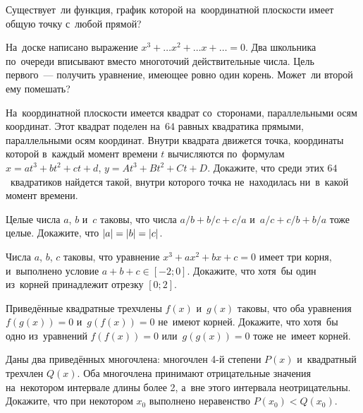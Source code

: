 \begin{problems}

\item
Существует~ли функция, график которой на~координатной плоскости имеет общую
точку с~любой прямой?

\item
На~доске написано выражение $x^{3} + \ldots x^{2} + \ldots x + \ldots = 0$.
Два школьника по~очереди вписывают вместо многоточий действительные числа.
Цель первого~--- получить уравнение, имеющее ровно один корень.
Может~ли второй ему помешать?

\item
На~координатной плоскости имеется квадрат со~сторонами, параллельными осям
координат.
Этот квадрат поделен на~$64$ равных квадратика прямыми, параллельными осям
координат.
Внутри квадрата движется точка, координаты которой в~каждый момент времени $t$
вычисляются по~формулам
$x = a t^3 + b t^2 + c t + d$, $y = A t^3 + B t^2 + C t + D$.
Докажите, что среди этих $64$~квадратиков найдется такой, внутри которого точка
не~находилась ни~в~какой момент времени.

\item
Целые числа $a$, $b$ и~$c$ таковы, что числа
$a / b + b / c + c / a$ и~$a / c + c / b + b / a$ тоже целые.
Докажите, что $\lvert a \rvert = \lvert b \rvert = \lvert c \rvert$.

\item
Числа $a$, $b$, $c$ таковы, что уравнение $x^3 + a x^2 + b x  + c = 0$ имеет
три корня, и~выполнено условие $a + b + c \in [-2; 0]$.
Докажите, что хотя~бы один из~корней принадлежит отрезку $[0; 2]$.

\item
Приведённые квадратные трехчлены $f(x)$ и~$g(x)$ таковы, что оба уравнения
$f(g(x)) = 0$ и~$g(f(x)) = 0$ не~имеют корней.
Докажите, что хотя~бы одно из~уравнений $f(f(x)) = 0$ или~$g(g(x)) = 0$ тоже
не~имеет корней.

\item
Даны два приведённых многочлена: многочлен 4-й степени $P(x)$ и~квадратный
трехчлен $Q(x)$.
Оба многочлена принимают отрицательные значения на~некотором интервале длины
более 2, а~вне этого интервала неотрицательны.
Докажите, что при некотором $x_0$ выполнено неравенство $P(x_0) < Q(x_0)$.

\end{problems}

\endgroup %


